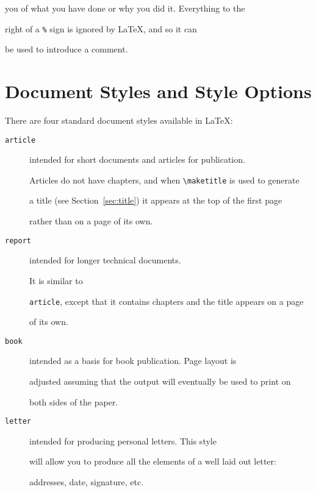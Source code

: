 you of what you have done or why you did it.  Everything to the

right of a \verb|%| sign is ignored by \LaTeX{}, and so it can

be used to introduce a comment.



\section{Document Styles and Style Options}\label{sec:styles}



There are four standard document styles available in \LaTeX:

\nobreak

\begin{description}



\item[{\tt article}]  intended for short documents and articles for publication.

Articles do not have chapters, and when \verb|\maketitle| is used to generate

a title (see Section~\ref{sec:title}) it appears at the top of the first page

rather than on a page of its own.



\item[{\tt report}] intended for longer technical documents.

It is similar to

{\tt article}, except that it contains chapters and the title appears on a page

of its own.



\item[{\tt book}] intended as a basis for book publication.  Page layout is

adjusted assuming that the output will eventually be used to print on

both sides of the paper.



\item[{\tt letter}]  intended for producing personal letters.  This style

will allow you to produce all the elements of a well laid out letter:

addresses, date, signature, etc.

\end{description}



